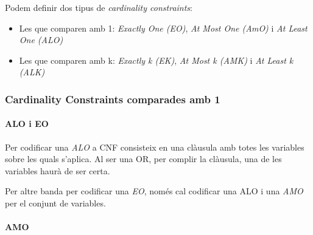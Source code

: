 \documentclass[11pt,a4paper,twoside]{report}
\begin{document}
  Podem definir dos tipus de \textit{cardinality constraints}:
  \begin{itemize}
    \item Les que comparen amb 1: \textit{Exactly One (EO)}, \textit{At Most One (AmO)} i \textit{At Least One (ALO)}
    \item Les que comparen amb k: \textit{Exactly k (EK)}, \textit{At Most k (AMK)} i \textit{At Least k (ALK)}
  \end{itemize}

  \subsubsection{Cardinality Constraints comparades amb 1}

  \paragraph*{ALO i EO}
  
  Per codificar una \textit{ALO} a CNF consisteix en una clàusula amb totes les variables sobre les quals s'aplica. Al ser una OR, per complir la clàusula, una de les variables haurà de ser certa.

  Per altre banda per codificar una \textit{EO}, només cal codificar una ALO i una \textit{AMO} per el conjunt de variables.
  
  \paragraph*{AMO}
\end{document}
